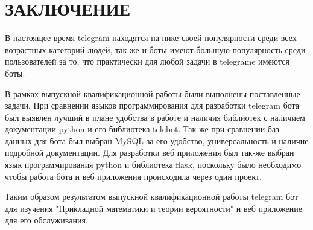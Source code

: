 \documentclass[12pt, oldlfont, amsfonts]{report}
\begin{document}
\chapter*{\large{{ЗАКЛЮЧЕНИЕ}}}
В настоящее время telegram находятся на пике своей популярности среди всех возрастных категорий людей, так же и боты имеют большую популярность среди пользователей за то, что практически для любой задачи в telegrame имеются боты.

В рамках выпускной квалификационной работы были выполнены поставленные задачи. При сравнении языков программирования для разработки telegram бота был выявлен лучший в плане удобства в работе и наличия библиотек с наличием документации python и его библиотека telebot. Так же при сравнении баз данных для бота был выбран MySQL за его удобство, универсальность и наличие подробной документации. Для разработки веб приложения был так-же выбран язык программирования python и библиотека flask, поскольку было необходимо чтобы работа бота и веб приложения происходила через один проект.

Таким образом результатом выпускной квалификационной работы telegram бот для изучения "Прикладной математики и теории вероятности" и веб приложение для его обслуживания.
\end{document}
